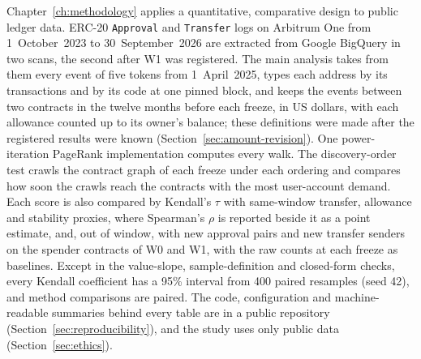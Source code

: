 Chapter~\ref{ch:methodology} applies a quantitative, comparative design to public ledger data. ERC-20 \texttt{Approval} and \texttt{Transfer} logs on Arbitrum One from 1~October~2023 to 30~September~2026 are extracted from Google BigQuery in two scans, the second after W1 was registered. The main analysis takes from them every event of five tokens from 1~April~2025, types each address by its transactions and by its code at one pinned block, and keeps the events between two contracts in the twelve months before each freeze, in US dollars, with each allowance counted up to its owner's balance; these definitions were made after the registered results were known (Section~\ref{sec:amount-revision}). One power-iteration PageRank implementation computes every walk. The discovery-order test crawls the contract graph of each freeze under each ordering and compares how soon the crawls reach the contracts with the most user-account demand. Each score is also compared by Kendall's $\tau$ with same-window transfer, allowance and stability proxies, where Spearman's $\rho$ is reported beside it as a point estimate, and, out of window, with new approval pairs and new transfer senders on the spender contracts of W0 and W1, with the raw counts at each freeze as baselines. Except in the value-slope, sample-definition and closed-form checks, every Kendall coefficient has a 95\% interval from 400 paired resamples (seed 42), and method comparisons are paired. The code, configuration and machine-readable summaries behind every table are in a public repository (Section~\ref{sec:reproducibility}), and the study uses only public data (Section~\ref{sec:ethics}).


